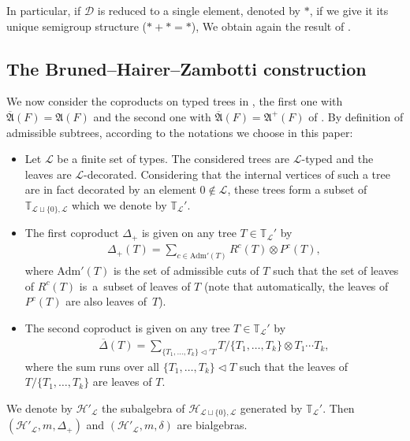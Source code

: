 \documentclass[pdftex]{sigma}
\numberwithin{equation}{section}
\renewcommand{\L}{\mathcal{L}}
\newcommand{\D}{\mathcal{D}}
\newcommand{\adm}{\mathrm{Adm}}
\newcommand{\h}{\mathcal{H}}
\newcommand{\bfT}{\mathbb{T}}
\begin{document}
In particular, if $\D$ is reduced to a single element, denoted by $*$,
if we give it its unique semigroup structure ($*+*=*$), We obtain again the result of \cite{Manchon}.

\subsection{The Bruned--Hairer--Zambotti construction}

We now consider the coproducts on typed trees in \cite[Theorem 2.2.16]{Bruned},
the first one with \mbox{$\overline{\mathfrak{A}}(F)=\mathfrak{A}(F)$} and the second one with
$\overline{\mathfrak{A}}(F)=\mathfrak{A}^+(F)$ of \cite[Definition 2.4.1]{Bruned}.
By definition \cite[Definition~2.26]{Bruned} of admissible subtrees, according to the notations we choose in this paper:
\begin{itemize}\itemsep=0pt
\item Let $\L$ be a finite set of types. The considered trees are $\L$-typed and the leaves are $\L$-decorated.
Considering that the internal vertices of such a tree are in fact decorated by an element $0\notin \L$,
these trees form a subset of $\bfT_{\L\sqcup\{0\},\L}$ which we denote by $\bfT_\L'$.
\item The first coproduct $\Delta_+$ is given on any tree $T\in \bfT_\L'$ by
\begin{gather*}
\Delta_+(T)=\sum_{c\in \adm'(T)} R^c(T)\otimes P^c(T),
\end{gather*}
where $\adm'(T)$ is the set of admissible cuts of $T$ such that the set of leaves of $R^c(T)$ is~a~subset of leaves of $T$
(note that automatically, the leaves of $P^c(T)$ are also leaves of~$T$).
\item The second coproduct is given on any tree $T\in \bfT_\L'$ by
\begin{gather*}
\overline{\Delta}(T)=\sum_{\{T_1,\dots,T_k\}\triangleleft' T}T/\{T_1,\dots,T_k\}\otimes T_1\cdots T_k,
\end{gather*}
where the sum runs over all $\{T_1,\dots,T_k\}\triangleleft T$ such that the leaves of $T/\{T_1,\dots,T_k\}$
are leaves of $T$.
\end{itemize}
We denote by $\h'_\L$ the subalgebra of $\h_{\L\sqcup\{0\}, \L}$ generated by $\bfT_\L'$.
Then $(\h'_\L,m,\Delta_+)$ and $(\h'_\L,m,\delta)$ are bialgebras.
\end{document}
